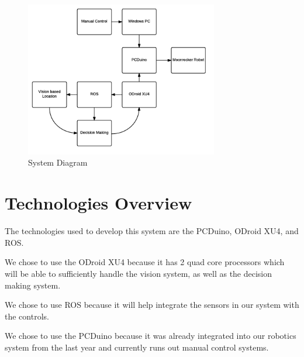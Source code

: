 \begin{figure}[tbh]
\begin{center}
\includegraphics[width=0.75\textwidth]{./design}
\end{center}
\caption{System Diagram \label{systemdiagram}}
\end{figure}
\newpage
\section{Technologies Overview}
The technologies used to develop this system are the PCDuino, ODroid XU4, and ROS.
\vspace{2mm}

We chose to use the ODroid XU4 because it has 2 quad core processors which will be able to sufficiently handle the vision system, as well as the decision making system.
\vspace{2mm}


We chose to use ROS because it will help integrate the sensors in our system with the controls.
\vspace{2mm}


We chose to use the PCDuino because it was already integrated into our robotics system from the last year and currently runs out manual control systems.



